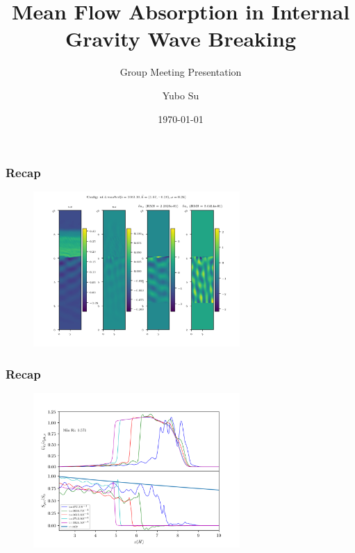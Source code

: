 \documentclass[dvipsnames, 10pt]{beamer}
\begin{document}
\title[Group Meeting 03/08/19]{
Mean Flow Absorption in Internal Gravity Wave Breaking}
\subtitle{Group Meeting Presentation}
\author{Yubo Su}
\date{\today}

\maketitle

\begin{frame}
    \frametitle{Recap}

    \begin{figure}[t]
        \centering
        \includegraphics[width=0.7\textwidth]{snapshot.png}
    \end{figure}
\end{frame}

\begin{frame}
    \frametitle{Recap}

    \begin{figure}[t]
        \centering
        \includegraphics[width=0.7\textwidth]{fluxes.png}
    \end{figure}
\end{frame}
\end{document}
